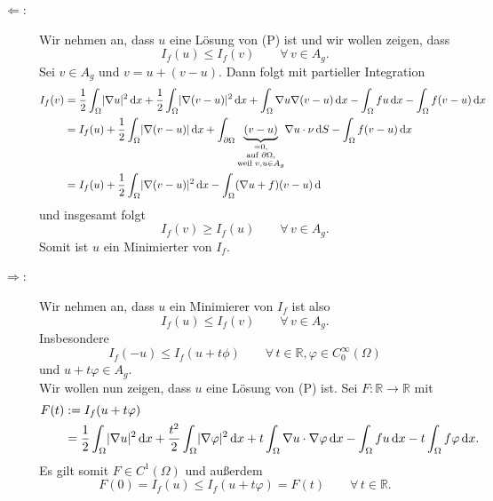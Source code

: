 \begin{beweis}
	\begin{description}
		\item[$\Leftarrow $:] Wir nehmen an, dass $u$ eine Lösung von (P) ist und wir wollen zeigen, dass 
		\[
			I_f(u) \leq I_f(v) \qquad \forall\,  v \in A_g .
		\] 
		Sei $v \in A_g$ und $v = u + (v-u)$. Dann folgt mit partieller Integration
		\begin{align*}
			I_f(v) &= \frac{1}{2} \int_{\Omega}^{} \lvert \nabla  u\rvert^2 \,\mathrm{d}x + \frac{1}{2} \int_{ \Omega}^{} \lvert  \nabla (v-u)\rvert^2 \,\mathrm{d}x 
			+ \int_{ \Omega}^{}  \nabla u  \nabla (v-u) \,\mathrm{d}x - \int_{\Omega}^{}fu \,\mathrm{d}x - \int_{\Omega}^{}f(v-u) \,\mathrm{d}x \\
			&= I_f(u) + \frac{1}{2} \int_{\Omega}^{} \lvert  \nabla (v-u)\rvert \,\mathrm{d}x 
			+ \int_{\partial \Omega}^{} \underset{\substack{=0, \\ \text{auf } \partial \Omega, \\\text{weil }v,u \in A_g}}{\underbrace{(v-u)}} 
			\nabla u \cdot \nu \,\mathrm{d}S - \int_{\Omega}^{}f(v-u) \,\mathrm{d}x \\
			&= I_f(u) + \frac{1}{2} \int_{\Omega}^{} \lvert  \nabla (v-u)\rvert^2 \,\mathrm{d}x - \int_{\Omega}^{} ( \nabla u + f)(v-u) \,\mathrm{d}
		\end{align*}
		und insgesamt folgt 
		\[
			I_f(v) \geq I_f(u) \qquad \forall\, v \in A_g.
		\]
		Somit ist $u$ ein Minimierter von $I_f$.
		\item[$\Rightarrow $:] Wir nehmen an, dass $u$ ein Minimierer von $I_f$ ist also 
		\[
			I_f(u) \leq I_f(v) \qquad \forall\, v \in A_g.
		\]
		Insbesondere 
		\[
			I_f(-u) \leq I_f(u + t \phi) \qquad \forall\,  t \in \mathbb{R}, \varphi \in C^{\infty}_0(\Omega)
		\]
		und $u + t \varphi \in A_g$. \\
		Wir wollen nun zeigen, dass $u$ eine Lösung von (P) ist. Sei $F: \mathbb{R} \to \mathbb{R}$ mit
		\begin{align*}
			F(t) &:= I_f(u + t \varphi) \\ &= \frac{1}{2} \int_{\Omega}^{} \lvert  \nabla u\rvert^2 \,\mathrm{d}x 
			+ \frac{t^2}{2} \int_{\Omega} \lvert \nabla \varphi\rvert^2 \,\mathrm{d}x + t \int_{\Omega}^{}  \nabla u \cdot  \nabla \varphi \,\mathrm{d}x
			- \int_{\Omega}^{} fu \,\mathrm{d}x - t \int_{\Omega}^{}f \varphi \,\mathrm{d}x.
		\end{align*}
		Es gilt somit $F \in C^1(\Omega)$ und außerdem
		\[
			F(0) = I_f(u) \leq I_f(u + t \varphi) = F(t) \qquad \forall\, t \in \mathbb{R}.
\]
\end{description}
\end{beweis}
